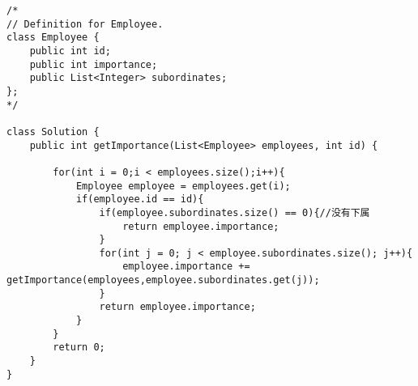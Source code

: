 \documentclass[a4paper]{report}
\begin{document}
\begin{lstlisting}
/*
// Definition for Employee.
class Employee {
    public int id;
    public int importance;
    public List<Integer> subordinates;
};
*/

class Solution {
    public int getImportance(List<Employee> employees, int id) {

        for(int i = 0;i < employees.size();i++){
            Employee employee = employees.get(i);
            if(employee.id == id){
                if(employee.subordinates.size() == 0){//没有下属
                    return employee.importance;
                }
                for(int j = 0; j < employee.subordinates.size(); j++){
                    employee.importance += getImportance(employees,employee.subordinates.get(j));
                }
                return employee.importance;
            }
        }
        return 0;
    }
}
\end{lstlisting}
\end{document}

